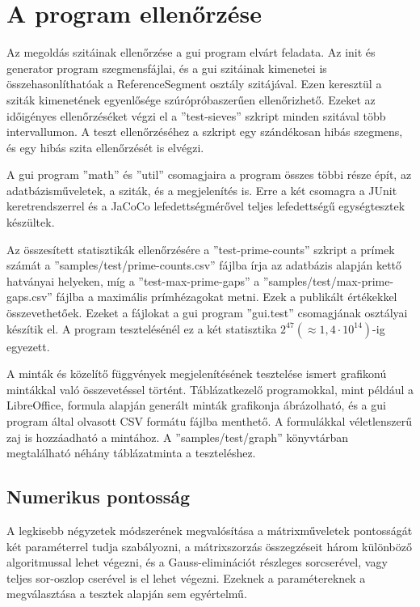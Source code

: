 \pagebreak
\section{A program ellenőrzése}

Az megoldás szitáinak ellenőrzése a gui program elvárt feladata.
Az init és generator program szegmensfájlai, és a gui szitáinak kimenetei is összehasonlíthatóak a ReferenceSegment osztály szitájával.
Ezen keresztül a sziták kimenetének egyenlősége szúrópróbaszerűen ellenőrizhető.
Ezeket az időigényes ellenőrzéséket végzi el a ''test-sieves'' szkript minden szitával több intervallumon.
A teszt ellenőrzéséhez a szkript egy szándékosan hibás szegmens, és egy hibás szita ellenőrzését is elvégzi.

A gui program ''math'' és ''util'' csomagjaira a program összes többi része épít, az adatbázisműveletek, a sziták, és a megjelenítés is. Erre a két csomagra a JUnit keretrendszerrel és a JaCoCo lefedettségmérővel teljes lefedettségű egységtesztek készültek.

Az összesített statisztikák ellenőrzésére a ''test-prime-counts'' szkript a prímek számát a ''samples/test/prime-counts.csv'' fájlba írja az adatbázis alapján kettő hatványai helyeken, míg a ''test-max-prime-gaps'' a ''samples/test/max-prime-gaps.csv'' fájlba a maximális prímhézagokat metni.
Ezek a publikált értékekkel\cite{gaps}\cite{pi} összevethetőek. Ezeket a fájlokat a gui program ''gui.test'' csomagjának osztályai készítik el. A program tesztelésénél ez a két statisztika $2^{47}(\approx1,4\cdot10^{14})$-ig egyezett.

A minták és közelítő függvények megjelenítésének tesztelése ismert grafikonú mintákkal való összevetéssel történt.
Táblázatkezelő programokkal, mint például a LibreOffice, formula alapján generált minták grafikonja ábrázolható, és a gui program által olvasott CSV formátu fájlba menthető.
A formulákkal véletlenszerű zaj is hozzáadható a mintához.
A ''samples/test/graph'' könyvtárban megtalálható néhány táblázatminta a teszteléshez.

\subsection{Numerikus pontosság}

A legkisebb négyzetek módszerének megvalósítása a mátrixműveletek pontosságát két paraméterrel tudja szabályozni, a mátrixszorzás összegzéseit három különböző algoritmussal lehet végezni, és a Gauss-eliminációt részleges sorcserével, vagy teljes sor-oszlop cserével is el lehet végezni.
Ezeknek a paramétereknek a megválasztása a tesztek alapján sem egyértelmű.

